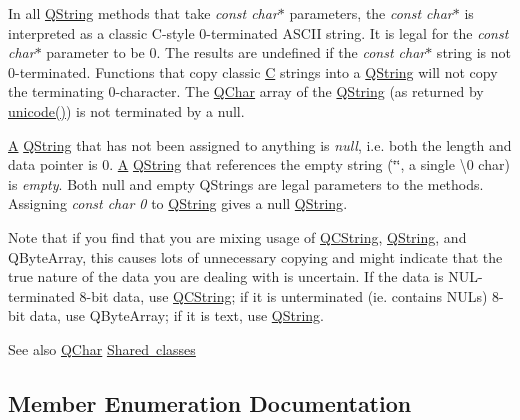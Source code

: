 In all \mbox{\hyperlink{class_q_string}{Q\+String}} methods that take {\itshape const char$\ast$} parameters, the {\itshape const char$\ast$} is interpreted as a classic C-\/style 0-\/terminated A\+S\+C\+II string. It is legal for the {\itshape const char$\ast$} parameter to be 0. The results are undefined if the {\itshape const char$\ast$} string is not 0-\/terminated. Functions that copy classic \mbox{\hyperlink{class_c}{C}} strings into a \mbox{\hyperlink{class_q_string}{Q\+String}} will not copy the terminating 0-\/character. The \mbox{\hyperlink{class_q_char}{Q\+Char}} array of the \mbox{\hyperlink{class_q_string}{Q\+String}} (as returned by \mbox{\hyperlink{class_q_string_af653a95345ba3cd5bade2a1e07f2bb58}{unicode()}}) is not terminated by a null.

\mbox{\hyperlink{class_a}{A}} \mbox{\hyperlink{class_q_string}{Q\+String}} that has not been assigned to anything is {\itshape null}, i.\+e. both the length and data pointer is 0. \mbox{\hyperlink{class_a}{A}} \mbox{\hyperlink{class_q_string}{Q\+String}} that references the empty string (\char`\"{}\char`\"{}, a single \textquotesingle{}\textbackslash{}0\textquotesingle{} char) is {\itshape empty}. Both null and empty Q\+Strings are legal parameters to the methods. Assigning {\itshape const char 0} to \mbox{\hyperlink{class_q_string}{Q\+String}} gives a null \mbox{\hyperlink{class_q_string}{Q\+String}}.

Note that if you find that you are mixing usage of \mbox{\hyperlink{class_q_c_string}{Q\+C\+String}}, \mbox{\hyperlink{class_q_string}{Q\+String}}, and Q\+Byte\+Array, this causes lots of unnecessary copying and might indicate that the true nature of the data you are dealing with is uncertain. If the data is N\+U\+L-\/terminated 8-\/bit data, use \mbox{\hyperlink{class_q_c_string}{Q\+C\+String}}; if it is unterminated (ie. contains N\+U\+Ls) 8-\/bit data, use Q\+Byte\+Array; if it is text, use \mbox{\hyperlink{class_q_string}{Q\+String}}.

\begin{DoxySeeAlso}{See also}
\mbox{\hyperlink{class_q_char}{Q\+Char}} \mbox{\hyperlink{}{Shared classes}} 
\end{DoxySeeAlso}


\subsection{Member Enumeration Documentation}
\mbox{\label{class_q_string_acaff43b133319ea651f19aac6b967406}} 
